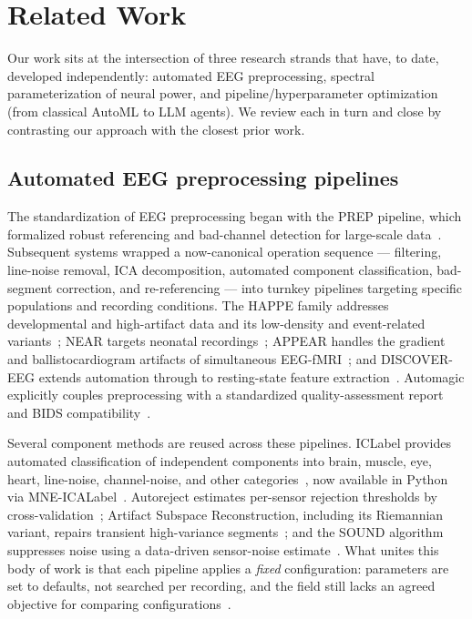 
\section{Related Work}
\label{sec:related}

Our work sits at the intersection of three research strands that have, to date, developed independently: automated EEG preprocessing, spectral parameterization of neural power, and pipeline/hyperparameter optimization (from classical AutoML to LLM agents). We review each in turn and close by contrasting our approach with the closest prior work.

\subsection{Automated EEG preprocessing pipelines}
\label{sec:rw_preproc}

The standardization of EEG preprocessing began with the PREP pipeline, which formalized robust referencing and bad-channel detection for large-scale data~\cite{BigdelyShamloEtAl2015}. Subsequent systems wrapped a now-canonical operation sequence --- filtering, line-noise removal, ICA decomposition, automated component classification, bad-segment correction, and re-referencing --- into turnkey pipelines targeting specific populations and recording conditions. The HAPPE family addresses developmental and high-artifact data and its low-density and event-related variants~\cite{GabardDurnamEtAl2018, LopezEtAl2022, MonachinoEtAl2022}; NEAR targets neonatal recordings~\cite{KumaravelEtAl2022}; APPEAR handles the gradient and ballistocardiogram artifacts of simultaneous EEG-fMRI~\cite{MayeliEtAl2021}; and DISCOVER-EEG extends automation through to resting-state feature extraction~\cite{vilaEtAl2023}. Automagic explicitly couples preprocessing with a standardized quality-assessment report and BIDS compatibility~\cite{PedroniEtAl2019}.

Several component methods are reused across these pipelines. ICLabel provides automated classification of independent components into brain, muscle, eye, heart, line-noise, channel-noise, and other categories~\cite{PionTonachiniEtAl2019}, now available in Python via MNE-ICALabel~\cite{LiEtAl2022}. Autoreject estimates per-sensor rejection thresholds by cross-validation~\cite{JasEtAl2017}; Artifact Subspace Reconstruction, including its Riemannian variant, repairs transient high-variance segments~\cite{BlumEtAl2019}; and the SOUND algorithm suppresses noise using a data-driven sensor-noise estimate~\cite{MutanenEtAl2018}. What unites this body of work is that each pipeline applies a \emph{fixed} configuration: parameters are set to defaults, not searched per recording, and the field still lacks an agreed objective for comparing configurations~\cite{PedroniEtAl2019}.

